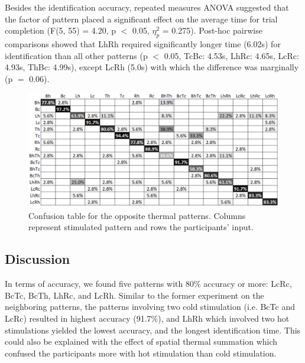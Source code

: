 \documentclass[preprint,12pt]{elsarticle}
\begin{document}
 Besides the identification accuracy, repeated measures ANOVA suggested that the factor of pattern placed a significant effect on the average time for trial completion (F(5, 55) = 4.20, p $<$ 0.05, $\eta_p^2$ = 0.275). Post-hoc pairwise comparisons showed that LhRh required significantly longer time (6.02s) for identification than all other patterns (p $<$ 0.05, TcBc: 4.53s, LhRc: 4.65s, LcRc: 4.93s, ThBc: 4.99s), except LcRh (5.0s) with which the difference was marginally (p $=$ 0.06).

\begin{figure}[tp]
  \centering
  \includegraphics[width=0.9\columnwidth]{img/fig13.png}
  \caption{Confusion table for the opposite thermal patterns. Columns represent stimulated pattern and rows the participants' input.}
  \label{fig:13}
\end{figure}

\subsection{Discussion}
In terms of accuracy, we found five patterns with 80\% accuracy or more: LcRc, BcTc, BcTh, LhRc, and LcRh. Similar to the former experiment on the neighboring patterns, the patterns involving two cold stimulation (i.e. BcTc and LcRc) resulted in highest accuracy (91.7\%), and LhRh which involved two hot stimulations yielded the lowest accuracy, and the longest identification time. This could also be explained with the effect of spatial thermal summation which confused the participants more with hot stimulation than cold stimulation.
\end{document}
